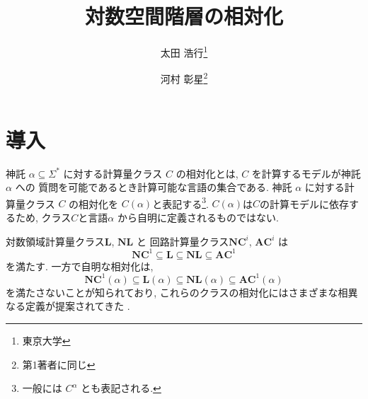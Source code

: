 \documentclass[10pt,a4paper,twocolumn]{jarticle}
\title{対数空間階層の相対化}
\author{太田 浩行\thanks{東京大学} \and
河村 彰星\thanks{第1著者に同じ}
}
\date{}
\theoremstyle{definition}
\theoremstyle{remark}
\newcommand{\classfont}{\mathbf}
\newcommand{\AC}{\classfont{AC}}
\newcommand{\NC}{\classfont{NC}}
\renewcommand{\L}{\classfont{L}}
\newcommand{\NL}{\classfont{NL}}
\begin{document}
\maketitle\thispagestyle{LAtitleheadings}



\section{導入}
神託 $\alpha \subseteq \Sigma^*$ に対する計算量クラス $C$ の相対化とは,
$C$ を計算するモデルが神託 $\alpha$ への
質問を可能であるとき計算可能な言語の集合である.
神託 $\alpha$ に対する計算量クラス $C$ の相対化を
$C(\alpha)$と表記する\footnote{一般には $C^\alpha$ とも表記される.}.
$C(\alpha)$は$C$の計算モデルに依存するため, クラス$C$と言語$\alpha$
から自明に定義されるものではない.

対数領域計算量クラス$\L$, $\NL$ と
回路計算量クラス$\NC^i$, $\AC^i$ は
\begin{equation*}
 \NC^1 \subseteq \L \subseteq \NL \subseteq \AC^1
\end{equation*}
を満たす.
一方で自明な相対化は,
\begin{equation}
 \NC^1(\alpha) \subseteq \L(\alpha) \subseteq \NL(\alpha) \subseteq \AC^1(\alpha) \label{property}
\end{equation}
を満たさないことが知られており,
これらのクラスの相対化にはさまざまな相異なる定義が提案されてきた
\cite{aehlig2007relativizing,buss1988relativized,ladner1976relativization,wilson1988measure}.
\end{document}
